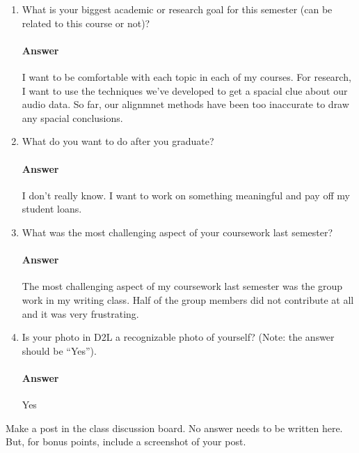 \documentclass{article}
\begin{document}
\begin{enumerate}
      \item What is your biggest academic or research goal for this semester (can
            be related to this course or not)?
            
            \paragraph{Answer} I want to be comfortable with each topic in each of my courses. For research, I want to 
            use the techniques we've developed to get a spacial clue about our audio data. So far, our alignmnet
            methods have been too inaccurate to draw any spacial conclusions.
            
      \item What do you want to do after you graduate?
            
            \paragraph{Answer} I don't really know. I want to work on something meaningful and pay off my student loans.
            
      \item What was the most challenging aspect of your coursework last semester?
            
            \paragraph{Answer} The most challenging aspect of my coursework last semester was the group work in my writing
            class. Half of the group members did not contribute at all and it was very frustrating.
            
      \item Is your photo in D2L a recognizable photo of yourself?  (Note: the
            answer should be ``Yes'').
            
            \paragraph{Answer} Yes
            
\end{enumerate}



Make a post in the class discussion board. No answer needs to be written here.
But, for bonus points, include a screenshot of your post.
\end{document}
